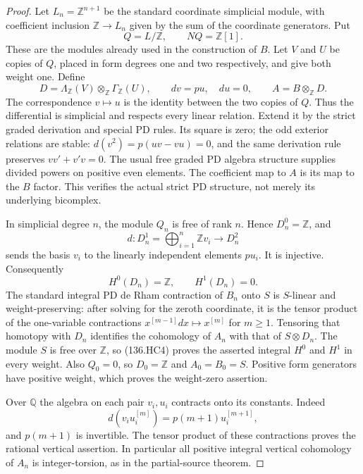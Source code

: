 \begin{proof}
Let $L_n=\mathbb Z^{n+1}$ be the standard coordinate simplicial
module, with coefficient inclusion $\mathbb Z\to L_n$ given
by the sum of the coordinate generators. Put
\[
             Q=L/\mathbb Z,\qquad NQ=\mathbb Z[1].
\]
These are the modules already used in the construction of $B$.
Let $V$ and $U$ be copies of $Q$, placed in form degrees one
and two respectively, and give both weight one. Define
\[
 D=\Lambda_{\mathbb Z}(V)\otimes_{\mathbb Z}\Gamma_{\mathbb Z}(U),
        \qquad d v=p u,\quad d u=0,\qquad
 A=B\otimes_{\mathbb Z}D.                                 \tag{136.HC3}
\]
The correspondence $v\mapsto u$ is the identity between the
two copies of $Q$. Thus the differential is simplicial and
respects every linear relation. Extend it by the strict
graded derivation and special PD rules. Its square is zero;
the odd exterior relations are stable: $d(v^2)=p(uv-vu)=0$,
and the same derivation rule preserves $vv'+v'v=0$.
The usual free graded PD algebra structure supplies divided
powers on positive even elements. The coefficient map to $A$
is its map to the $B$ factor. This verifies the actual strict
PD structure, not merely its underlying bicomplex.

In simplicial degree $n$, the module $Q_n$ is free of rank
$n$. Hence $D_n^0=\mathbb Z$, and
\[
     d:D_n^1=\bigoplus_{i=1}^n\mathbb Z v_i
             \longrightarrow D_n^2
\]
sends the basis $v_i$ to the linearly independent elements
$p u_i$. It is injective. Consequently
\[
                       H^0(D_n)=\mathbb Z,
                              \qquad H^1(D_n)=0.           \tag{136.HC4}
\]
The standard integral PD de Rham contraction of $B_n$ onto
$S$ is $S$-linear and weight-preserving: after solving for
the zeroth coordinate, it is the tensor product of the
one-variable contractions
$x^{[m-1]}dx\mapsto x^{[m]}$ for $m\ge1$.
Tensoring that homotopy with $D_n$ identifies the cohomology
of $A_n$ with that of $S\otimes D_n$.
The module $S$ is free over $\mathbb Z$, so (136.HC4) proves
the asserted integral $H^0$ and $H^1$ in every weight.
Also $Q_0=0$, so $D_0=\mathbb Z$ and $A_0=B_0=S$.
Positive form generators have positive weight, which proves
the weight-zero assertion.

Over $\mathbb Q$ the algebra on each pair $v_i,u_i$ contracts
onto its constants. Indeed
\[
             d(v_i u_i^{[m]})=p(m+1)u_i^{[m+1]},
\]
and $p(m+1)$ is invertible. The tensor product of these
contractions proves the rational vertical assertion.
In particular all positive integral vertical cohomology of
$A_n$ is integer-torsion, as in the partial-source theorem.


\end{proof}
